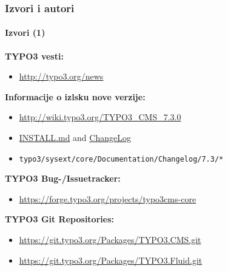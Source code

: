 \begin{frame}[fragile]
	\frametitle{Izvori i autori}
	\framesubtitle{Izvori (1)}

	\textbf{TYPO3 vesti:}
		\begin{itemize}\smaller
			\item \url{http://typo3.org/news}
		\end{itemize}

	\textbf{Informacije o izlsku nove verzije:}
		\begin{itemize}\smaller
			\item \url{http://wiki.typo3.org/TYPO3_CMS_7.3.0}
			\item \href{https://github.com/TYPO3/TYPO3.CMS/blob/master/INSTALL.md}{INSTALL.md} and \href{https://github.com/TYPO3/TYPO3.CMS/blob/master/ChangeLog}{ChangeLog}
			\item \texttt{typo3/sysext/core/Documentation/Changelog/7.3/*}
		\end{itemize}

	\textbf{TYPO3 Bug-/Issuetracker:}
		\begin{itemize}\smaller
			\item \url{https://forge.typo3.org/projects/typo3cms-core}
		\end{itemize}

	\textbf{TYPO3 Git Repositories:}
		\begin{itemize}\smaller
			\item \url{https://git.typo3.org/Packages/TYPO3.CMS.git}
			\item \url{https://git.typo3.org/Packages/TYPO3.Fluid.git}
		\end{itemize}

\end{frame}


